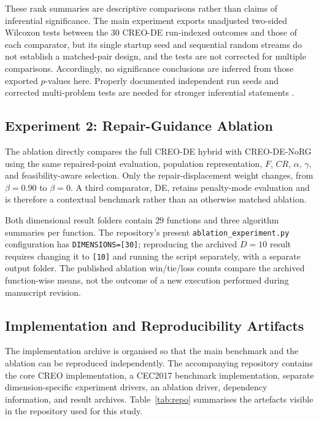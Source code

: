 \documentclass[a4paper,fleqn]{cas-sc}
\begin{document}
These rank summaries are descriptive comparisons rather than claims of inferential significance. The main experiment exports unadjusted two-sided Wilcoxon tests between the 30 CREO-DE run-indexed outcomes and those of each comparator, but its single startup seed and sequential random streams do not establish a matched-pair design, and the tests are not corrected for multiple comparisons. Accordingly, no significance conclusions are inferred from those exported $p$-values here. Properly documented independent run seeds and corrected multi-problem tests are needed for stronger inferential statements \cite{garcia2009nonparametric,derrac2011tutorial}.

\subsection{Experiment 2: Repair-Guidance Ablation}

The ablation directly compares the full CREO-DE hybrid with CREO-DE-NoRG using the same repaired-point evaluation, population representation, $F$, $CR$, $\alpha$, $\gamma$, and feasibility-aware selection. Only the repair-displacement weight changes, from $\beta=0.90$ to $\beta=0$. A third comparator, DE, retains penalty-mode evaluation and is therefore a contextual benchmark rather than an otherwise matched ablation.

Both dimensional result folders contain 29 functions and three algorithm summaries per function. The repository's present \texttt{ablation\_experiment.py} configuration has \texttt{DIMENSIONS=[30]}; reproducing the archived $D=10$ result requires changing it to \texttt{[10]} and running the script separately, with a separate output folder. The published ablation win/tie/loss counts compare the archived function-wise means, not the outcome of a new execution performed during manuscript revision.

\subsection{Implementation and Reproducibility Artifacts}

The implementation archive is organised so that the main benchmark and the ablation can be reproduced independently. The accompanying repository contains the core CREO implementation, a CEC2017 benchmark implementation, separate dimension-specific experiment drivers, an ablation driver, dependency information, and result archives. Table~\ref{tab:repo} summarises the artefacts visible in the repository used for this study.
\end{document}
